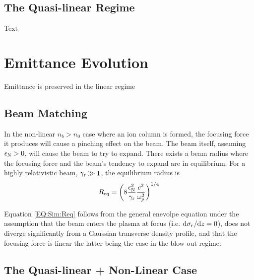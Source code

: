 \subsection{The Quasi-linear Regime}
\label{Sim:QLin}

Text


\section{Emittance Evolution}
\label{Sim:Emitt}

Emittance is preserved in the linear regime


\subsection{Beam Matching}
\label{Sim:Match}

In the non-linear $n_{b} > n_{0}$ case where an ion column is formed, the focusing force it produces will cause a pinching effect on the beam. The beam itself, assuming $\epsilon_{\mathrm{N}} > 0$, will cause the beam to try to expand. There exists a beam radius where the focusing force and the beam's tendency to expand are in equilibrium. For a highly relativistic beam, $\gamma_{\mathrm{r}} \gg 1$, the equilibrium radius is \cite{krall:1995}
\begin{equation}
    R_{\mathrm{eq}} = \left( 8 \frac{\epsilon_{\mathrm{N}}^2}{\gamma_{\mathrm{r}}} \frac{c^2}{\omega_{p}^2} \right)^{1/4} \label{EQ:Sim:Req}
\end{equation}

Equation \ref{EQ:Sim:Req} follows from the general enevolpe equation \cite{lee:1976} under the assumption that the beam enters the plasma at focus (i.e. $\mathrm{d}\sigma_{r}/\mathrm{d}z = 0$), does not diverge significantly from a Gaussian transverse density profile, and that the focusing force is linear \cite{krall:1995} \dash the latter being the case in the blow-out regime.


\subsection{The Quasi-linear + Non-Linear Case}
\label{Sim:QLinNonLin}

